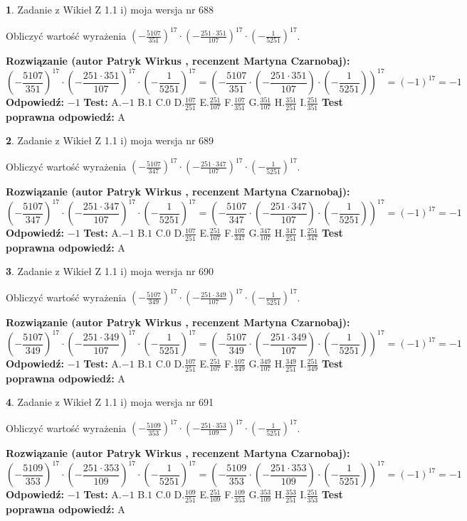 \documentclass[12pt, a4paper]{article}
\theoremstyle{definition} %
\newtheorem{zad}{}
\newcommand{\zadStart}[1]{\begin{zad}#1\newline}
\newcommand{\zadStop}{\end{zad}}
\newcommand{\rozwStart}[2]{\noindent \textbf{Rozwiązanie (autor #1 , recenzent #2): }\newline}
\newcommand{\rozwStop}{\newline}
\newcommand{\odpStart}{\noindent \textbf{Odpowiedź:}\newline}
\newcommand{\odpStop}{\newline}
\newcommand{\testStart}{\noindent \textbf{Test:}\newline}
\newcommand{\testStop}{\newline}
\newcommand{\kluczStart}{\noindent \textbf{Test poprawna odpowiedź:}\newline}
\newcommand{\kluczStop}{\newline}
\begin{document}
\zadStart{Zadanie z Wikieł Z 1.1 i) moja wersja nr 688}

Obliczyć wartość wyrażenia $(-\frac{5107}{351})^{17} \cdot (-\frac{251 \cdot 351}{107})^{17} \cdot (-\frac{1}{5251})^{17}$.
\zadStop
\rozwStart{Patryk Wirkus}{Martyna Czarnobaj}
$$(-\frac{5107}{351})^{17} \cdot (-\frac{251 \cdot 351}{107})^{17} \cdot (-\frac{1}{5251})^{17} = (-\frac{5107}{351} \cdot (-\frac{251 \cdot 351}{107}) \cdot (-\frac{1}{5251}))^{17} = (-1)^{17} = -1$$
\rozwStop
\odpStart
$-1$
\odpStop
\testStart
A.$-1$ B.$1$ C.$0$ D.$\frac{107}{251}$ E.$\frac{251}{107}$
F.$\frac{107}{351}$ G.$\frac{351}{107}$
H.$\frac{351}{251}$
I.$\frac{251}{351}$
\testStop
\kluczStart
A
\kluczStop



\zadStart{Zadanie z Wikieł Z 1.1 i) moja wersja nr 689}

Obliczyć wartość wyrażenia $(-\frac{5107}{347})^{17} \cdot (-\frac{251 \cdot 347}{107})^{17} \cdot (-\frac{1}{5251})^{17}$.
\zadStop
\rozwStart{Patryk Wirkus}{Martyna Czarnobaj}
$$(-\frac{5107}{347})^{17} \cdot (-\frac{251 \cdot 347}{107})^{17} \cdot (-\frac{1}{5251})^{17} = (-\frac{5107}{347} \cdot (-\frac{251 \cdot 347}{107}) \cdot (-\frac{1}{5251}))^{17} = (-1)^{17} = -1$$
\rozwStop
\odpStart
$-1$
\odpStop
\testStart
A.$-1$ B.$1$ C.$0$ D.$\frac{107}{251}$ E.$\frac{251}{107}$
F.$\frac{107}{347}$ G.$\frac{347}{107}$
H.$\frac{347}{251}$
I.$\frac{251}{347}$
\testStop
\kluczStart
A
\kluczStop



\zadStart{Zadanie z Wikieł Z 1.1 i) moja wersja nr 690}

Obliczyć wartość wyrażenia $(-\frac{5107}{349})^{17} \cdot (-\frac{251 \cdot 349}{107})^{17} \cdot (-\frac{1}{5251})^{17}$.
\zadStop
\rozwStart{Patryk Wirkus}{Martyna Czarnobaj}
$$(-\frac{5107}{349})^{17} \cdot (-\frac{251 \cdot 349}{107})^{17} \cdot (-\frac{1}{5251})^{17} = (-\frac{5107}{349} \cdot (-\frac{251 \cdot 349}{107}) \cdot (-\frac{1}{5251}))^{17} = (-1)^{17} = -1$$
\rozwStop
\odpStart
$-1$
\odpStop
\testStart
A.$-1$ B.$1$ C.$0$ D.$\frac{107}{251}$ E.$\frac{251}{107}$
F.$\frac{107}{349}$ G.$\frac{349}{107}$
H.$\frac{349}{251}$
I.$\frac{251}{349}$
\testStop
\kluczStart
A
\kluczStop



\zadStart{Zadanie z Wikieł Z 1.1 i) moja wersja nr 691}

Obliczyć wartość wyrażenia $(-\frac{5109}{353})^{17} \cdot (-\frac{251 \cdot 353}{109})^{17} \cdot (-\frac{1}{5251})^{17}$.
\zadStop
\rozwStart{Patryk Wirkus}{Martyna Czarnobaj}
$$(-\frac{5109}{353})^{17} \cdot (-\frac{251 \cdot 353}{109})^{17} \cdot (-\frac{1}{5251})^{17} = (-\frac{5109}{353} \cdot (-\frac{251 \cdot 353}{109}) \cdot (-\frac{1}{5251}))^{17} = (-1)^{17} = -1$$
\rozwStop
\odpStart
$-1$
\odpStop
\testStart
A.$-1$ B.$1$ C.$0$ D.$\frac{109}{251}$ E.$\frac{251}{109}$
F.$\frac{109}{353}$ G.$\frac{353}{109}$
H.$\frac{353}{251}$
I.$\frac{251}{353}$
\testStop
\kluczStart
A
\kluczStop
\end{document}
